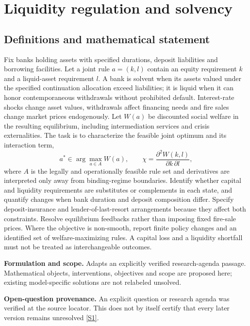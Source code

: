 \documentclass[11pt]{article}
\newcommand{\sref}[2]{\hyperlink{source:#1:#2}{[S#2]}}
\begin{document}
\section*{Liquidity regulation and solvency}\label{30007603}
\subsection{Definitions and mathematical statement}
Fix banks holding assets with specified durations, deposit liabilities and borrowing facilities. Let a joint rule \(a=(k,l)\) contain an equity requirement \(k\) and a liquid-asset requirement \(l\). A bank is solvent when its assets valued under the specified continuation allocation exceed liabilities; it is liquid when it can honor contemporaneous withdrawals without prohibited default. Interest-rate shocks change asset values, withdrawals affect financing needs and fire sales change market prices endogenously. Let \(W(a)\) be discounted social welfare in the resulting equilibrium, including intermediation services and crisis externalities. The task is to characterize the feasible joint optimum and its interaction term,
\[a^*\in\arg\max_{a\in A}W(a),\qquad\chi=\frac{\partial^2W(k,l)}{\partial k\,\partial l},\]
where \(A\) is the legally and operationally feasible rule set and derivatives are interpreted only away from binding-regime boundaries. Identify whether capital and liquidity requirements are substitutes or complements in each state, and quantify changes when bank duration and deposit composition differ. Specify deposit-insurance and lender-of-last-resort arrangements because they affect both constraints. Resolve equilibrium feedbacks rather than imposing fixed fire-sale prices. Where the objective is non-smooth, report finite policy changes and an identified set of welfare-maximizing rules. A capital loss and a liquidity shortfall must not be treated as interchangeable outcomes.

\par\textbf{Formulation and scope.} Adapts an explicitly verified research-agenda passage. Mathematical objects, interventions, objectives and scope are proposed here; existing model-specific solutions are not relabeled unsolved.

\par\textbf{Open-question provenance.} An explicit question or research agenda was verified at the source locator. This does not by itself certify that every later version remains unresolved \sref{30007603}{1}.
\end{document}
